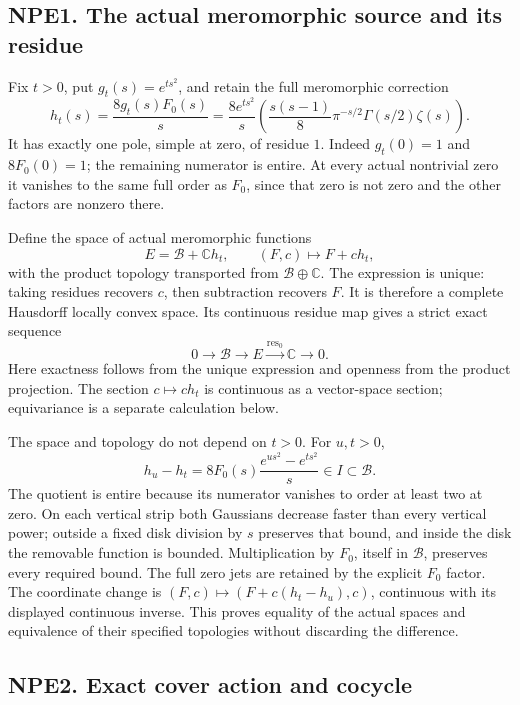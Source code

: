 \subsection{NPE1. The actual meromorphic source and its
residue}\label{npe1.-the-actual-meromorphic-source-and-its-residue}

Fix \(t>0\), put \(g_t(s)=e^{ts^2}\), and retain the full meromorphic
correction \[
h_t(s)=\frac{8g_t(s)F_0(s)}s
=\frac{8e^{ts^2}}s\left(\frac{s(s-1)}8\pi^{-s/2}\Gamma(s/2)\zeta(s)\right).
\tag{NPE1.1}
\] It has exactly one pole, simple at zero, of residue \(1\). Indeed
\(g_t(0)=1\) and \(8F_0(0)=1\); the remaining numerator is entire. At
every actual nontrivial zero it vanishes to the same full order as
\(F_0\), since that zero is not zero and the other factors are nonzero
there.

Define the space of actual meromorphic functions \[
E=\mathcal B+\mathbb C h_t,
\qquad (F,c)\longmapsto F+ch_t,
\tag{NPE1.2}
\] with the product topology transported from
\(\mathcal B\oplus\mathbb C\). The expression is unique: taking residues
recovers \(c\), then subtraction recovers \(F\). It is therefore a
complete Hausdorff locally convex space. Its continuous residue map
gives a strict exact sequence \[
0\longrightarrow\mathcal B\longrightarrow E
\xrightarrow{\operatorname{res}_0}\mathbb C\longrightarrow0.
\tag{NPE1.3}
\] Here exactness follows from the unique expression and openness from
the product projection. The section \(c\mapsto ch_t\) is continuous as a
vector-space section; equivariance is a separate calculation below.

The space and topology do not depend on \(t>0\). For \(u,t>0\), \[
h_u-h_t=8F_0(s)\frac{e^{us^2}-e^{ts^2}}s\in I\subset\mathcal B.
\tag{NPE1.4}
\] The quotient is entire because its numerator vanishes to order at
least two at zero. On each vertical strip both Gaussians decrease faster
than every vertical power; outside a fixed disk division by \(s\)
preserves that bound, and inside the disk the removable function is
bounded. Multiplication by \(F_0\), itself in \(\mathcal B\), preserves
every required bound. The full zero jets are retained by the explicit
\(F_0\) factor. The coordinate change is
\((F,c)\mapsto(F+c(h_t-h_u),c)\), continuous with its displayed
continuous inverse. This proves equality of the actual spaces and
equivalence of their specified topologies without discarding the
difference.

\subsection{NPE2. Exact cover action and
cocycle}\label{npe2.-exact-cover-action-and-cocycle}

